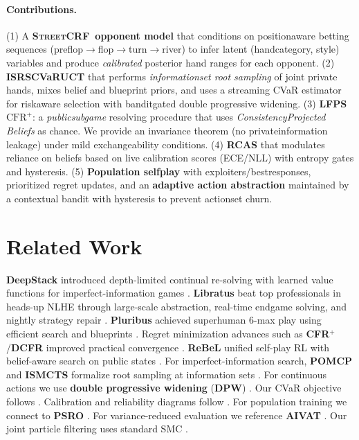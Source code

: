 \documentclass[10pt]{article}
\newcommand{\sCRF}{\textsc{Street\textendash CRF}\xspace} %
\newcommand{\CFRplus}{\ensuremath{\mathrm{CFR}^{+}}\xspace}
\newcommand{\1}{\mathbf{1}}
\theoremstyle{plain}
\begin{document}
\paragraph{Contributions.}
(1) A \textbf{\sCRF\ opponent model} that conditions on position\textendash aware betting sequences (preflop$\rightarrow$flop$\rightarrow$turn$\rightarrow$river) to infer latent (hand\textendash category, style) variables and produce \emph{calibrated} posterior hand ranges for each opponent. 
(2) \textbf{IS\textendash RS\textendash CVaR\textendash UCT} that performs \emph{information\textendash set root sampling} of joint private hands, mixes belief and blueprint priors, and uses a streaming CVaR estimator for risk\textendash aware selection with bandit\textendash gated double progressive widening.
(3) \textbf{LF\textendash PS\textendash \CFRplus}: a \emph{public\textendash subgame} re\textendash solving procedure that uses \emph{Consistency\textendash Projected Beliefs} as chance. We provide an invariance theorem (no private\textendash information leakage) under mild exchangeability conditions.
(4) \textbf{RCAS} that modulates reliance on beliefs based on live calibration scores (ECE/NLL) with entropy gates and hysteresis.
(5) \textbf{Population self\textendash play} with exploiters/best\textendash responses, prioritized regret updates, and an \textbf{adaptive action abstraction} maintained by a contextual bandit with hysteresis to prevent action\textendash set churn.

\section{Related Work}
\textbf{DeepStack} introduced depth-limited continual re-solving with learned value functions for imperfect-information games \citep{moravcik2017deepstack}. \textbf{Libratus} beat top professionals in heads-up NLHE through large-scale abstraction, real-time endgame solving, and nightly strategy repair \citep{brown2017libratus,brown2018libratus}. \textbf{Pluribus} achieved superhuman 6-max play using efficient search and blueprints \citep{brown2019pluribus}. Regret minimization advances such as \textbf{CFR$^+$}/\textbf{DCFR} improved practical convergence \citep{tammelin2014cfrplus,dcfr2023}. \textbf{ReBeL} unified self-play RL with belief-aware search on public states \citep{brown2020rebel}. 
For imperfect-information search, \textbf{POMCP} and \textbf{ISMCTS} formalize root sampling at information sets \citep{silver2010pomcp,cowling2012ismcts}. For continuous actions we use \textbf{double progressive widening} (\textbf{DPW}) \citep{couetoux2011dpw}. Our CVaR objective follows \citet{rockafellar2000cvar}. Calibration and reliability diagrams follow \citet{guo2017calibration}. For population training we connect to \textbf{PSRO} \citep{lanctot2017psro}. For variance-reduced evaluation we reference \textbf{AIVAT} \citep{burch2018aivat}. Our joint particle filtering uses standard SMC \citep{doucet2001smc}.
\end{document}

